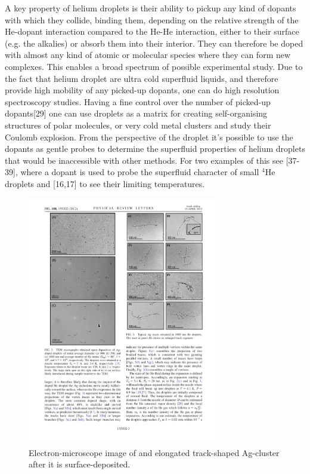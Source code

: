 \documentclass[12pt,a4paper]{book}
\begin{document}
		A key property of helium droplets is their ability to pickup any kind of dopants with which they collide, binding them, depending on the relative strength of the He-dopant interaction compared to the He-He interaction, either to their surface (e.g. the alkalies) or absorb them into their interior. They can therefore be doped with almost any kind of atomic or molecular species where they can form new complexes. This enables a broad spectrum of possible experimental study. Due to the fact that helium droplet are ultra cold superfluid liquids, and therefore provide high mobility of any picked-up dopants, one can do high resolution spectroscopy studies. Having a fine control over the number of picked-up dopants[29] one can use droplets as a matrix for creating self-organising structures of polar molecules, or very cold metal clusters and study their Coulomb explosion. From the perspective of the droplet it's possible to use the dopants as gentle probes to determine the superfluid properties of helium droplets that would be inaccessible with other methods. For two examples of this see [37-39], where a dopant is used to probe the superfluid character of small $^4$He droplets and [16,17] to see their limiting temperatures.\\
		
		\begin{figure}[t]
			\begin{center}
				\includegraphics[width=0.75\textwidth]{silver-filament}
			\end{center}
			\caption{Electron-microscope image of and elongated track-shaped Ag-cluster after it is surface-deposited.}
			\label{fig:silver-filament}
		\end{figure}	
				
\end{document}
